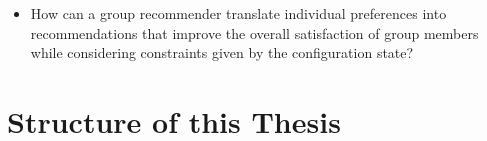 \begin{itemize}
    \item How can a group recommender translate individual preferences into recommendations that improve the overall satisfaction of group members while considering constraints given by the configuration state? 
\end{itemize}


\section{Structure of this Thesis}
\label{sec:Introduction:Structure}






